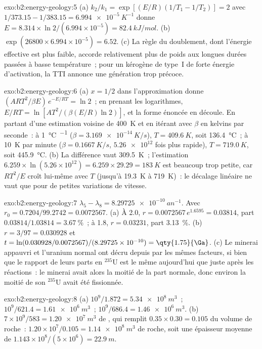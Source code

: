 \begin{solution}{exo:b2:energy-geology:5}
(a) $k_2/k_1 = \exp[(E/R)(1/T_1 - 1/T_2)] = 2$ avec $1/373.15 - 1/383.15 = \qty{6.994e-5}{K^{-1}}$
donne $E = 8.314 \times \ln 2/(6.994 \times 10^{-5}) = \qty{82.4}{kJ/mol}$. (b) $\exp(26800 \times
6.994 \times 10^{-5}) = 6.52$. (c) La règle du doublement, dont l'énergie effective est plus faible, accorde
relativement plus de poids aux longues durées passées à basse température~;
pour un kérogène de type~I de forte énergie d'activation, la TTI annonce une génération trop précoce.
\end{solution}

\begin{solution}{exo:b2:energy-geology:6}
(a) $x = 1/2$ dans l'approximation donne $(ART^2/\beta E)\,e^{-E/RT} = \ln 2$~; en prenant les logarithmes,
$E/RT = \ln[AT^2/(\beta(E/R)\ln 2)]$, et la forme énoncée en découle. En partant d'une estimation voisine de
\qty{400}{K} et en itérant avec $\beta$ en kelvins par seconde~: à \qty{1}{\celsius\per\Ma}
($\beta = \qty{3.169e-14}{K/s}$), $T = \qty{409.6}{K}$, soit \qty{136.4}{\celsius}~; à \qty{10}{K} par
minute ($\beta = \qty{0.1667}{K/s}$, $\num{5.26e12}$ fois plus rapide), $T = \qty{719.0}{K}$,
soit \qty{445.9}{\celsius}. (b) La différence vaut \qty{309.5}{K}~; l'estimation $6.259 \times
\ln(5.26 \times 10^{12}) = 6.259 \times 29.29 = \qty{183}{K}$ est beaucoup trop petite, car $RT^2/E$
croît lui-même avec $T$ (jusqu'à \qty{19.3}{K} à \qty{719}{K})~: le décalage linéaire ne vaut que pour de petites
variations de vitesse.
\end{solution}

\begin{solution}{exo:b2:energy-geology:7}
$\lambda_5 - \lambda_8 = \qty{8.29725e-10}{an^{-1}}$. Avec $r_0 = 0.7204/99.2742 = 0.0072567$.
(a) À \qty{2.0}{\Ga}, $r = 0.0072567\,e^{1.6595} = 0.03814$, part $0.03814/1.03814 =
\qty{3.67}{\percent}$~; à \qty{1.8}{\Ga}, $r = 0.03231$, part \qty{3.13}{\percent}. (b) $r =
3/97 = 0.030928$ et $t = \ln(0.030928/0.0072567)/(8.29725 \times 10^{-10}) = \qty{1.75}{\Ga}$.
(c) Le minerai appauvri et l'uranium normal ont décru depuis par les mêmes facteurs, si bien que le rapport de leurs parts
en $^{235}$U est le même aujourd'hui que juste après les réactions~:
le minerai avait alors la moitié de la part normale, donc environ la moitié de son $^{235}$U avait été fissionnée.
\end{solution}

\begin{solution}{exo:b2:energy-geology:8}
(a) $10^9/1.872 = \qty{5.34e8}{m^3}$~; $10^9/621.4 = \qty{1.61e6}{m^3}$~; $10^9/686.4 =
\qty{1.46e6}{m^3}$. (b) $7 \times 10^9/583 = \qty{1.20e7}{m^3}$ de , qui remplit
$0.35 \times 0.30 = 0.105$ du volume de roche~: $1.20 \times 10^7/0.105 = \qty{1.14e8}{m^3}$ de roche,
soit une épaisseur moyenne de $1.143 \times 10^8/(5 \times 10^6) = \qty{22.9}{m}$.
\end{solution}

